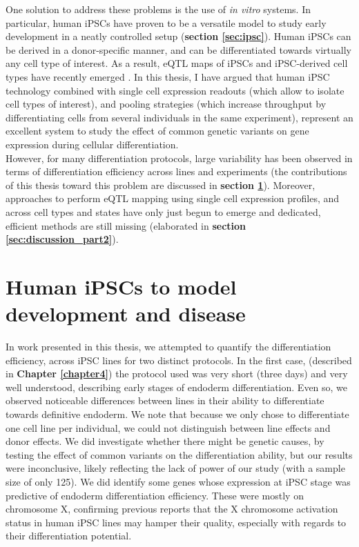 One solution to address these problems is the use of \textit{in vitro} systems.
In particular, human iPSCs have proven to be a versatile model to study early development in a neatly controlled setup (\textbf{section 
\ref{sec:ipsc}}).
Human iPSCs can be derived in a donor-specific manner, and can be differentiated towards virtually any cell type of interest.
As a result, eQTL maps of iPSCs and iPSC-derived cell types have recently emerged \cite{kilpinen2017common, schwartzentruber2018molecular}. 
In this thesis, I have argued that human iPSC technology combined with single cell expression readouts (which allow to isolate cell types of interest), and pooling strategies (which increase throughput by differentiating cells from several individuals in the same experiment), represent an excellent system to study the effect of common genetic variants on gene expression during cellular differentiation.\\

However, for many differentiation protocols, large variability has been observed in terms of differentiation efficiency across lines and experiments (the contributions of this thesis toward this problem are discussed in \textbf{section \ref{sec:discussion_part1}}).
Moreover, approaches to perform eQTL mapping using single cell expression profiles, and across cell types and states have only just begun to emerge and dedicated, efficient methods are still missing (elaborated in \textbf{section \ref{sec:discussion_part2}}).

\section{Human iPSCs to model development and disease}
\label{sec:discussion_part1}

In work presented in this thesis, we attempted to quantify the differentiation efficiency, across iPSC lines for two distinct protocols.
In the first case, (described in \textbf{Chapter 
\ref{chapter4}}) the protocol used was very short (three days) and very well understood, describing early stages of endoderm differentiation.
Even so, we observed noticeable differences between lines in their ability to differentiate towards definitive endoderm.
We note that because we only chose to differentiate one cell line per individual, we could not distinguish between line effects and donor effects.
We did investigate whether there might be genetic causes, by testing the effect of common variants on the differentiation ability, but our results were inconclusive, likely reflecting the lack of power of our study (with a sample size of only 125).
We did identify some genes whose expression at iPSC stage was predictive of endoderm differentiation efficiency.
These were mostly on chromosome X, confirming previous reports that the X chromosome activation status in human iPSC lines may hamper their quality, especially with regards to their differentiation potential.\\

